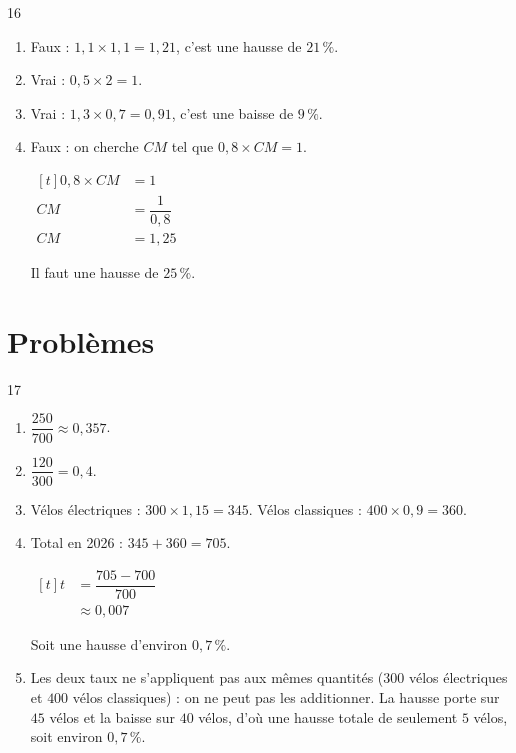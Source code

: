 \documentclass[10pt,a4paper]{article}
\begin{document}
\begin{corr}{16}
\begin{enumerate}[leftmargin=*]
    \item Faux : \(1,1\times 1,1=1,21\), c'est une hausse de \(21\,\%\).
    \item Vrai : \(0,5\times 2=1\).
    \item Vrai : \(1,3\times 0,7=0,91\), c'est une baisse de \(9\,\%\).
    \item Faux : on cherche \(CM\) tel que \(0,8\times CM=1\).

    \(\begin{aligned}[t] 0,8\times CM&=1\\ CM&=\dfrac{1}{0,8}\\ CM&=1,25\end{aligned}\)

    Il faut une hausse de \(25\,\%\).
\end{enumerate}
\end{corr}

\section{Problèmes}

\begin{corr}{17}
\begin{enumerate}[leftmargin=*]
    \item \(\dfrac{250}{700}\approx 0,357\).
    \item \(\dfrac{120}{300}=0,4\).
    \item Vélos électriques : \(300\times 1,15=345\). Vélos classiques : \(400\times 0,9=360\).
    \item Total en 2026 : \(345+360=705\).

    \(\begin{aligned}[t] t&=\dfrac{705-700}{700}\\ &\approx 0,007\end{aligned}\)

    Soit une hausse d'environ \(0,7\,\%\).
    \item Les deux taux ne s'appliquent pas aux mêmes quantités (\(300\) vélos électriques et \(400\) vélos classiques) : on ne peut pas les additionner. La hausse porte sur \(45\) vélos et la baisse sur \(40\) vélos, d'où une hausse totale de seulement \(5\) vélos, soit environ \(0,7\,\%\).
\end{enumerate}
\end{corr}
\end{document}
